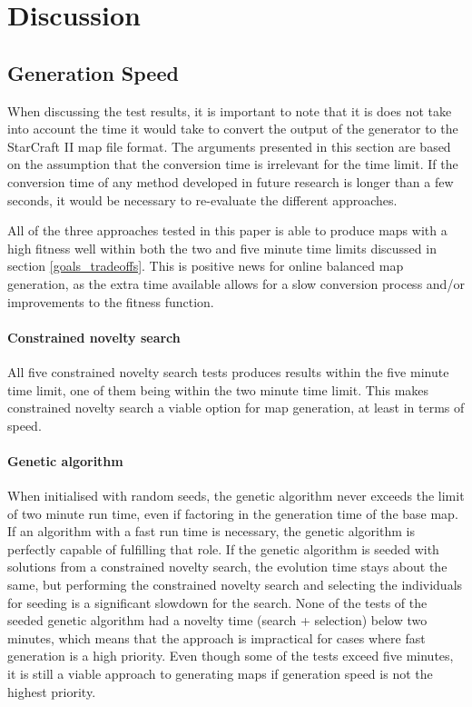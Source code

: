 \chapter{Discussion}
\label{discussion_quality}

\section{Generation Speed}
\label{discussion_speed}
When discussing the test results, it is important to note that it is does not take into account the time it would take to convert the output of the generator to the StarCraft II map file format. The arguments presented in this section are based on the assumption that the conversion time is irrelevant for the time limit. If the conversion time of any method developed in future research is longer than a few seconds, it would be necessary to re-evaluate the different approaches.

All of the three approaches tested in this paper is able to produce maps with a high fitness well within both the two and five minute time limits discussed in section \ref{goals_tradeoffs}. This is positive news for online balanced map generation, as the extra time available allows for a slow conversion process and/or improvements to the fitness function.

\subsubsection{Constrained novelty search}
All five constrained novelty search tests produces results within the five minute time limit, one of them being within the two minute time limit. This makes constrained novelty search a viable option for map generation, at least in terms of speed.

\subsubsection{Genetic algorithm}
When initialised with random seeds, the genetic algorithm never exceeds the limit of two minute run time, even if factoring in the generation time of the base map. If an algorithm with a fast run time is necessary, the genetic algorithm is perfectly capable of fulfilling that role. If the genetic algorithm is seeded with solutions from a constrained novelty search, the evolution time stays about the same, but performing the constrained novelty search and selecting the individuals for seeding is a significant slowdown for the search. None of the tests of the seeded genetic algorithm had a novelty time (search + selection) below two minutes, which means that the approach is impractical for cases where fast generation is a high priority. Even though some of the tests exceed five minutes, it is still a viable approach to generating maps if generation speed is not the highest priority.

